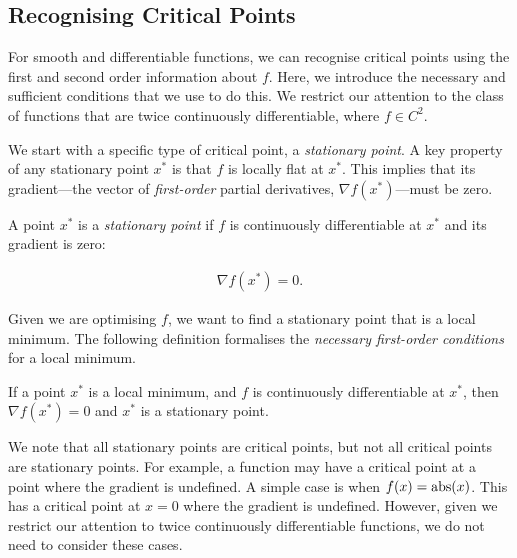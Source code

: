 \subsection{Recognising Critical Points}

\label{ssec:recognising_critical_points}



For smooth and differentiable functions, we can recognise critical points using the first and second order information about $f$. Here, we introduce the necessary and sufficient conditions that we use to do this. We restrict our attention to the class of functions that are twice continuously differentiable, where $f \in C^2$.




We start with a specific type of critical point, a \textit{stationary point}. A key property of any stationary point $x^*$ is that $f$ is locally flat at $x^*$. This implies that its gradient---the vector of \textit{first-order} partial derivatives, $\nabla f(x^*)$---must be zero.

\begin{definition}

    A point $x^*$ is a \textit{stationary point} if $f$ is continuously differentiable at $x^*$ and its gradient is zero:

    \begin{align}

        \nabla f(x^*) = 0.

    \end{align}

\end{definition}



Given we are optimising $f$, we want to find a stationary point that is a local minimum. The following definition formalises the \textit{necessary first-order conditions} for a local minimum.

\begin{definition}

    If a point $x^*$ is a local minimum, and $f$ is continuously differentiable at $x^*$, then $\nabla f(x^*) = 0$ and $x^*$ is a stationary point.

\end{definition}



We note that all stationary points are critical points, but not all critical points are stationary points. For example, a function may have a critical point at a point where the gradient is undefined. A simple case is when $f(x) = \operatorname{abs}({x})$. This has a critical point at $x = 0$ where the gradient is undefined. However, given we restrict our attention to twice continuously differentiable functions, we do not need to consider these cases. 



